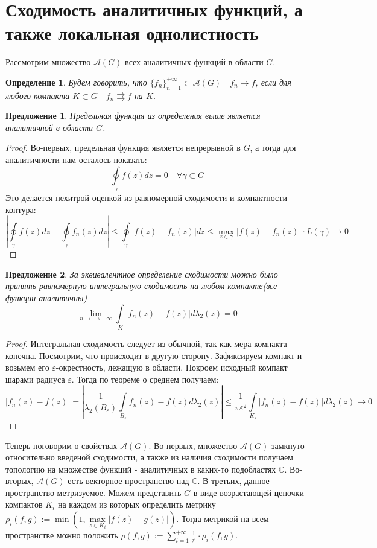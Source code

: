\documentclass[12pt,a4paper]{article} %
\newtheorem{definition}{Определение}
\newtheorem{proposition}{Предложение}
\newcommand{\Co}{\mathbb{C}}
\begin{document}
	\section{Сходимость аналитичных функций, а также локальная однолистность}
	Рассмотрим множество $\mathcal{A}(G)$ всех аналитичных функций в области $G$.
	\begin{definition}
		Будем говорить, что $\{f_n\}_{n=1}^{+\infty}\subset\mathcal{A}(G)\quad f_n\rightarrow f$, если для любого компакта $K\subset G\quad f_n\rightrightarrows f$ на $K$. 
	\end{definition}
	\begin{proposition}
		Предельная функция из определения выше является аналитичной в области $G$.
	\end{proposition}
	\begin{proof}
		Во-первых, предельная функция является непрерывной в $G$, а тогда для аналитичности нам осталось показать:
		$$\oint\limits_{\gamma}f(z)dz=0\quad \forall\gamma\subset G$$
		Это делается нехитрой оценкой из равномерной сходимости и компактности контура:
		$$\left|\oint\limits_{\gamma}f(z)dz-\oint\limits_{\gamma}f_n(z)dz\right|\leq \oint\limits_{\gamma}|f(z)-f_n(z)|dz\leq \underset{z\in\gamma}{\max}|f(z)-f_n(z)|\cdot L(\gamma)\rightarrow 0$$
	\end{proof}
	\begin{proposition}
		За эквивалентное определение сходимости можно было принять равномерную интегральную сходимость на любом компакте(все функции аналитичны)
		$$\underset{n\rightarrow\rightarrow +\infty}{\lim}\int\limits_K |f_n(z)-f(z)|d\lambda_2(z)=0$$
	\end{proposition}
	\begin{proof}
		Интегральная сходимость следует из обычной, так как мера компакта конечна. Посмотрим, что происходит в другую сторону. Зафиксируем компакт и возьмем его $\varepsilon$-окрестность, лежащую в области. Покроем исходный компакт шарами радиуса $\varepsilon$. Тогда по теореме о среднем получаем:
		$$|f_n(z)-f(z)|=\left|\frac{1}{\lambda_2(B_{\varepsilon})}\int\limits_{B_{\varepsilon}}f_n(z)-f(z)d\lambda_2(z)\right|\leq\frac{1}{\pi\varepsilon^2}\int\limits_{K_{\varepsilon}}|f_n(z)-f(z)|d\lambda_2(z)\rightarrow 0$$
	\end{proof}
	Теперь поговорим о свойствах $\mathcal{A}(G)$. Во-первых, множество $\mathcal{A}(G)$ замкнуто относительно введеной сходимости, а также из наличия сходимости получаем топологию на множестве функций - аналитичных в каких-то подобластях $\Co$. Во-вторых, $\mathcal{A}(G)$ есть векторное пространство над $\Co$. В-третьих, данное пространство метризуемое. Можем представить $G$ в виде возрастающей цепочки компактов $K_i$ на каждом из которых определить метрику $\rho_i(f,g):=\min(1,\underset{z\in K_i}{\max}|f(z)-g(z)|)$. Тогда метрикой на всем пространстве можно положить $\displaystyle\rho (f, g):=\sum_{i=1}^{+\infty}\frac{1}{2^i}\cdot\rho_i(f,g)$.
\end{document}
